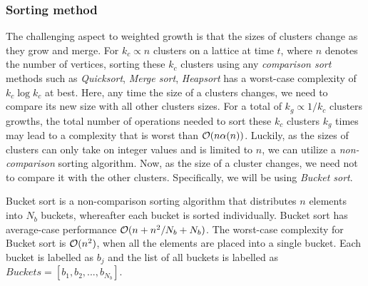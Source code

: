 \subsubsection{Sorting method}

The challenging aspect to weighted growth is that the sizes of clusters change as they grow and merge. For $k_c\propto n$ clusters on a lattice at time $t$, where $n$ denotes the number of vertices, sorting these $k_c$ clusters using any \emph{comparison sort} methods such as \emph{Quicksort}, \emph{Merge sort}, \emph{Heapsort} has a worst-case complexity of $k_c \log k_c$ at best. Here, any time the size of a clusters changes, we need to compare its new size with all other clusters sizes. For a total of $k_g \propto 1/k_c$ clusters growths, the total number of operations needed to sort these $k_c$ clusters $k_g$ times may lead to a complexity that is worst than $\mathcal{O}(n\alpha(n))$. Luckily, as the sizes of clusters can only take on integer values and is limited to $n$, we can utilize a \emph{non-comparison} sorting algorithm. Now, as the size of a cluster changes, we need not to compare it with the other clusters. Specifically, we will be using \emph{Bucket sort}. 
\begin{definition}\label{def:buckets}
  Bucket sort is a non-comparison sorting algorithm that distributes $n$ elements into $N_b$ buckets, whereafter each bucket is sorted individually. Bucket sort has average-case performance $\mathcal{O}(n + n^2/N_b + N_b)$. The worst-case complexity for Bucket sort is $\mathcal{O}(n^2)$, when all the elements are placed into a single bucket. Each bucket is labelled as $b_j$ and the list of all buckets is labelled as $Buckets=[b_1, b_2, ...,b_{N_b}]$. 
\end{definition}
